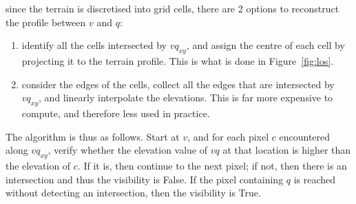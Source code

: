 since the terrain is discretised into grid cells, there are 2 options to reconstruct the profile between $v$ and $q$:
\begin{enumerate}
  \item identify all the cells intersected by $vq_{xy}$, and assign the centre of each cell by projecting it to the terrain profile. This is what is done in Figure~\ref{fig:los}.
  \item consider the edges of the cells, collect all the edges that are intersected by $vq_{xy}$, and linearly interpolate the elevations. This is far more expensive to compute, and therefore less used in practice.
\end{enumerate}

The algorithm is thus as follows.
Start at $v$, and for each pixel $c$ encountered along $vq_{xy}$, verify whether the elevation value of $vq$ at that location is higher than the elevation of $c$.
If it is, then continue to the next pixel; if not, then there is an intersection and thus the visibility is False.
If the pixel containing $q$ is reached without detecting an intersection, then the visibility is True.


